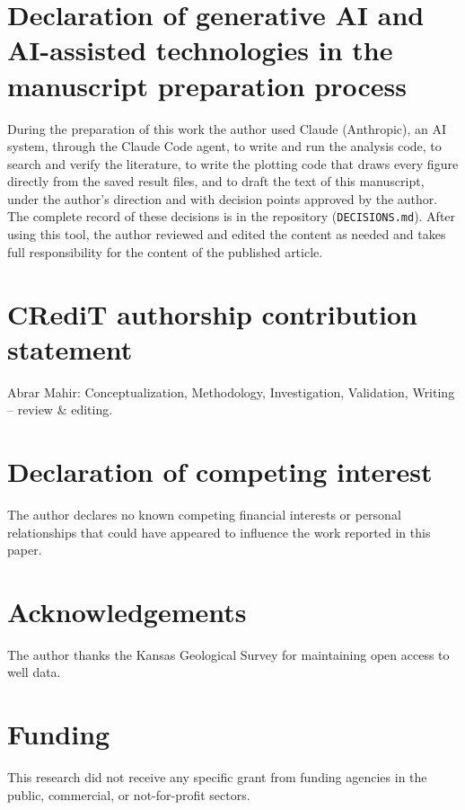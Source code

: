 \documentclass[preprint,12pt]{elsarticle}
\begin{document}
\section*{Declaration of generative AI and AI-assisted technologies in the manuscript preparation process}
During the preparation of this work the author used Claude (Anthropic), an AI system,
through the Claude Code agent, to write and run the analysis code, to search and verify the
literature, to write the plotting code that draws every figure directly from the saved result files, and to draft the text of this manuscript, under the author's
direction and with decision points approved by the author. The complete record of these
decisions is in the repository (\texttt{DECISIONS.md}). After using this tool, the author
reviewed and edited the content as needed and takes full responsibility for the content of the
published article.

\section*{CRediT authorship contribution statement}
Abrar Mahir: Conceptualization, Methodology, Investigation, Validation, Writing -- review \& editing.

\section*{Declaration of competing interest}
The author declares no known competing financial interests or personal relationships that
could have appeared to influence the work reported in this paper.

\section*{Acknowledgements}
The author thanks the Kansas Geological Survey for maintaining open access to well data.

\section*{Funding}
This research did not receive any specific grant from funding agencies in the public,
commercial, or not-for-profit sectors.



\end{document}
